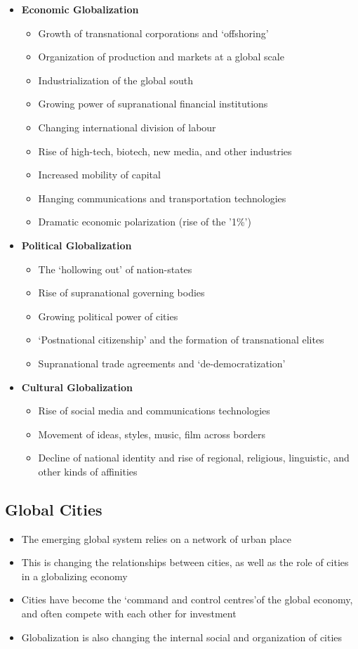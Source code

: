 \documentclass[11pt]{article}
\begin{document}
\begin{itemize}
\item \textbf{Economic Globalization}
\begin{itemize}
\item Growth of transnational corporations and ‘offshoring’
\item Organization of production and markets at a global scale
\item Industrialization of the global south
\item Growing power of supranational financial institutions
\item Changing international division of labour
\item Rise of high-tech, biotech, new media, and other industries
\item Increased mobility of capital
\item Hanging communications and transportation technologies
\item Dramatic economic polarization (rise of the ’1\%')
\end{itemize}

\item \textbf{Political Globalization}
\begin{itemize}
\item The ‘hollowing out’ of nation-states 
\item Rise of supranational governing bodies 
\item Growing political power of cities
\item ‘Postnational citizenship’ and the formation of transnational elites \item Supranational trade agreements and ‘de-democratization’
\end{itemize}
\item \textbf{Cultural Globalization}
\begin{itemize}
\item Rise of social media and communications technologies
\item Movement of ideas, styles, music, film across borders
\item Decline of national identity and rise of regional, religious, linguistic, and other kinds of affinities
\end{itemize}
\end{itemize}

\subsection{Global Cities}
\begin{itemize}
\item The emerging global system relies on a network of urban place
\item This is changing the relationships between cities, as well as the role of cities in a globalizing economy
\item Cities have become the ‘command and control centres’of the global economy, and often compete with each other for investment
\item Globalization is also changing the internal social and organization of cities
\end{itemize}
\end{document}
